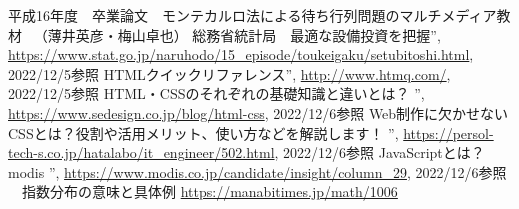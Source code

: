 \documentclass[12pt,a4j]{ltjsarticle}
\begin{document}
\begin{thebibliography}{99}
平成16年度　卒業論文　モンテカルロ法による待ち行列問題のマルチメディア教材 　（薄井英彦・梅山卓也）
 総務省統計局　最適な設備投資を把握”, \url{https://www.stat.go.jp/naruhodo/15_episode/toukeigaku/setubitoshi.html}, 2022/12/5参照
 HTMLクイックリファレンス”, \url{http://www.htmq.com/}, 2022/12/5参照
HTML・CSSのそれぞれの基礎知識と違いとは？ ”, \url{https://www.sedesign.co.jp/blog/html-css}, 2022/12/6参照
Web制作に欠かせないCSSとは？役割や活用メリット、使い方などを解説します！ ”, \url{https://persol-tech-s.co.jp/hatalabo/it_engineer/502.html}, 2022/12/6参照
JavaScriptとは？　modis ”, \url{https://www.modis.co.jp/candidate/insight/column_29}, 2022/12/6参照
　指数分布の意味と具体例 \url{https://manabitimes.jp/math/1006}
\end{thebibliography}
\end{document}
